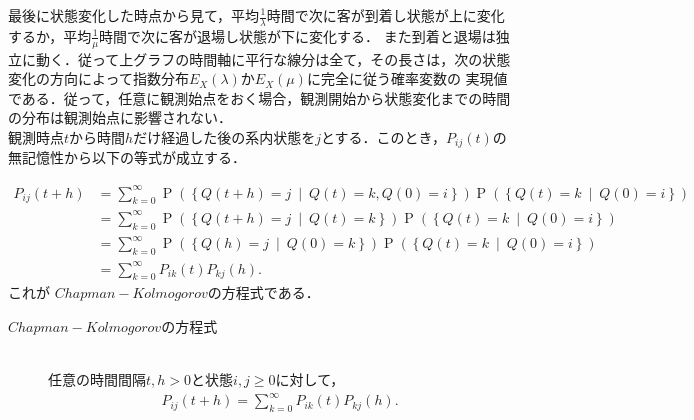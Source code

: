 \documentclass[a4j,papersize,disablejfam,slide,14pt]{jsarticle}
\def\cprob#1#2{\operatorname{P} \left(\left\{ #1 \ \middle|\ #2 \right\}\right)} %
\begin{document}
    最後に状態変化した時点から見て，平均$\frac{1}{\lambda}$時間で次に客が到着し状態が上に変化するか，平均$\frac{1}{\mu}$時間で次に客が退場し状態が下に変化する．
    また到着と退場は独立に動く．従って上グラフの時間軸に平行な線分は全て，その長さは，次の状態変化の方向によって指数分布$E_X(\lambda)$か$E_X(\mu)$に完全に従う確率変数の
    実現値である．従って，任意に観測始点をおく場合，観測開始から状態変化までの時間の分布は観測始点に影響されない．\\
    観測時点$t$から時間$h$だけ経過した後の系内状態を$j$とする．このとき，$P_{ij}(t)$の無記憶性から以下の等式が成立する．

    \begin{align}
    	P_{ij}(t+h) &= \sum_{k=0}^{\infty} \cprob{Q(t+h) = j}{Q(t) = k, Q(0) = i}\cprob{Q(t) = k}{Q(0) = i} \\
        &= \sum_{k=0}^{\infty} \cprob{Q(t+h) = j}{Q(t) = k}\cprob{Q(t) = k}{Q(0) = i} \\
        &= \sum_{k=0}^{\infty} \cprob{Q(h) = j}{Q(0) = k}\cprob{Q(t) = k}{Q(0) = i} \\
        &= \sum_{k=0}^{\infty} P_{ik}(t)P_{kj}(h).
    \end{align}
    これが $Chapman-Kolmogorov$の方程式である．
    \begin{screen}
    	\begin{description}
        	\item[$Chapman-Kolmogorov$の方程式]\mbox{}\\
            	任意の時間間隔$t,h > 0$と状態$i,j \geq 0$に対して，
                \begin{align}
            		P_{ij}(t+h) = \sum_{k=0}^{\infty} P_{ik}(t)P_{kj}(h).
                \end{align}
        \end{description}
    \end{screen}
\end{document}
